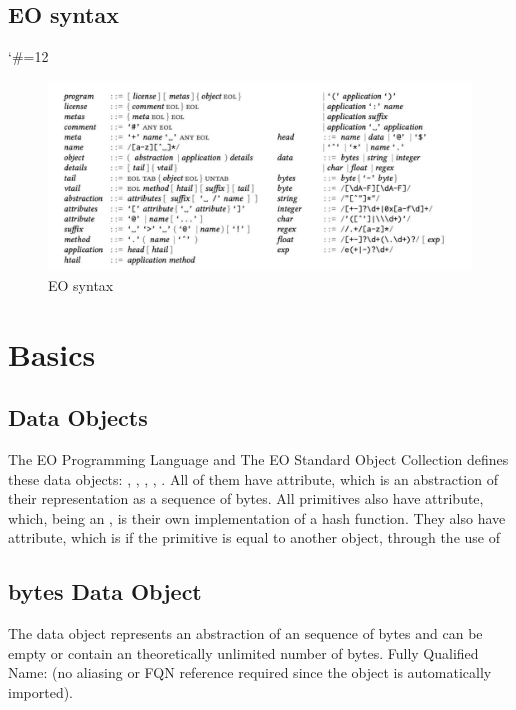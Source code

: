 \documentclass[12pt]{book}
\begin{document}
{\section{EO syntax}

\catcode`\#=12\relax
{}

\begin{figure}[ht]
  \centering
  \includegraphics[width=1\textwidth,]{EOsyntxax.jpg}
  \caption{EO syntax}
  \label{fig:uml1}
\end{figure}


\chapter{Basics} \label{chapter:basics}

\section{Data Objects}

The EO Programming Language and The EO Standard Object Collection defines these data objects: , , , , . All of them have  attribute, which is an abstraction of their representation as a sequence of bytes.
All primitives also have  attribute, which, being an , is their own implementation of a hash function. They also have  attribute, which is  if the primitive is equal to another object, through the use of 

\section{bytes Data Object}
The  data object represents an abstraction of an sequence of bytes and can be empty or contain an theoretically unlimited number of bytes.
Fully Qualified Name:  (no aliasing or FQN reference required since the object is automatically imported).

}
\end{document}
